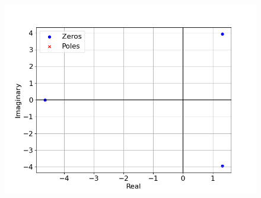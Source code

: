 \documentclass[journal,12pt,twocolumn]{IEEEtran}
\theoremstyle{remark}
\begin{document}

\begin{figure}[htbp]
    \centering
    \includegraphics[width = \columnwidth]{figs/poles and root_plot.png}
  \caption{}
    \label{fig:graph1}
\end{figure}

% 
\end{document}
